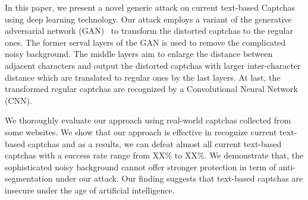 In this paper, we present a novel generic attack on current text-based Captchas using deep learning technology. Our attack employs a variant of the generative adversarial network (GAN)~\cite{pix2pix2016} to transform the distorted captchas to the regular ones. The former serval layers of the GAN is used to remove the complicated noisy background. The middle layers aim to enlarge the distance between adjacent characters and output the distorted captchas with larger inter-character distance which are translated to regular ones by the last layers. At last, the transformed regular captchas are recognized by a Convolutional Neural Network (CNN).

We thoroughly evaluate our approach using real-world captchas collected from some websites. We show that our approach is effective in recognize current text-based captchas and as a results, we can defeat almost all current text-based captchas with a success rate range from XX\% to XX\%. We demonstrate that, the sophisticated noisy background cannot offer stronger protection in term of anti-segmentation under our attack. Our finding suggests that text-based captchas are insecure under the age of artificial intelligence.

